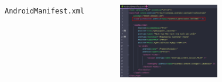 \documentclass{beamer}
\begin{document}
\begin{frame}
\begin{columns}
\begin{figure}
        \end{figure}
        \indent \texttt{AndroidManifest.xml}
        \begin{figure}
            \centering
            \includegraphics[width=\textwidth]{images/33.png}
        \end{figure}
    \end{columns}
\end{frame}
\end{document}
